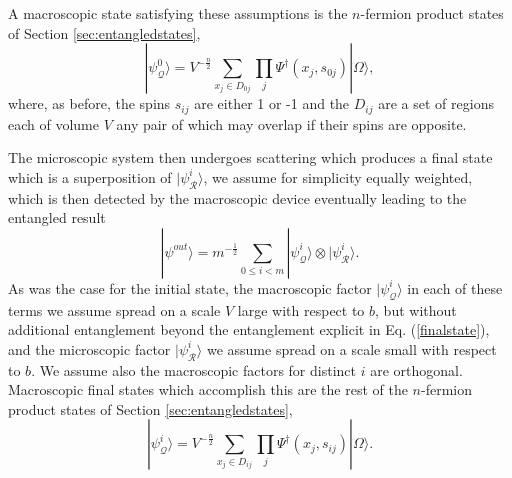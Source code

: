 \documentclass[twocolumn,amsmath,amssymb]{revtex4-1}
\begin{document}
A  macroscopic state satisfying these assumptions is 
the $n$-fermion product states of Section \ref{sec:entangledstates},
\begin{equation}
\label{macroproductstate}
|\psi^0_{\mathcal{Q}} \rangle  = V^{-\frac{n}{2}}\sum_{x_j \in D_{0j}} \prod_j \Psi^{\dagger}(x_j, s_{0j}) |\Omega \rangle ,
\end{equation}
where, as before, the spins $s_{ij}$ are either 1 or -1 and the $D_{ij}$ are a set of regions 
each of volume $V$ any pair of which may overlap if their spins are opposite.

The microscopic system then undergoes scattering which produces
a final state which is a superposition of $|\psi^i_{\mathcal{R}} \rangle $, we assume for simplicity
equally weighted, which is then detected by
the macroscopic device eventually leading to the entangled result
\begin{equation}
\label{finalstate}
|\psi^{out} \rangle  = m^{-\frac{1}{2}} \sum_{0 \le i < m} |\psi^i_{\mathcal{Q}} \rangle  \otimes |\psi^i_{\mathcal{R}} \rangle .
\end{equation}
As was the case for the initial state, the macroscopic factor $|\psi^i_{\mathcal{Q}} \rangle $ in each
of these terms we assume spread on a scale $V$ large with respect to $b$, but without
additional entanglement beyond the entanglement explicit in Eq. (\ref{finalstate}),
and the microscopic factor $|\psi^i_{\mathcal{R}} \rangle $ we assume 
spread on a scale small with respect to $b$.
We assume also the macroscopic factors for distinct $i$ are orthogonal. 
Macroscopic final states which accomplish this 
are the rest of the $n$-fermion product states of
Section \ref{sec:entangledstates},
\begin{equation}
\label{macroproductstate1}
|\psi^i_{\mathcal{Q}} \rangle  = V^{-\frac{n}{2}}\sum_{x_j \in D_{ij}} \prod_j \Psi^{\dagger}(x_j, s_{ij}) |\Omega \rangle .
\end{equation}
\end{document}
